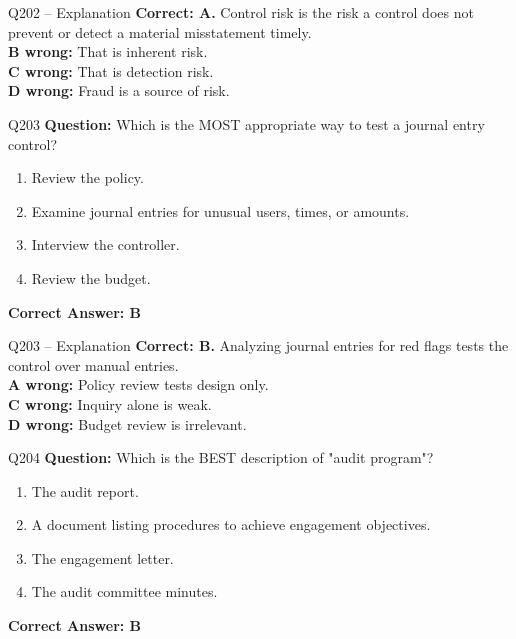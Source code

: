 \documentclass[aspectratio=169,10pt]{beamer}
\begin{document}
	\begin{frame}[t]{Q202 -- Explanation}
		\small
		\textbf{Correct: A.} Control risk is the risk a control does not prevent or detect a material misstatement timely. \\[4pt]
		\textbf{B wrong:} That is inherent risk. \\[2pt]
		\textbf{C wrong:} That is detection risk. \\[2pt]
		\textbf{D wrong:} Fraud is a source of risk.
	\end{frame}
	
	\begin{frame}[t]{Q203}
		\small
		\textbf{Question:} Which is the MOST appropriate way to test a journal entry control?
		\begin{enumerate}[label=\Alph*.,itemsep=1pt,topsep=2pt]
			\item Review the policy.
			\item Examine journal entries for unusual users, times, or amounts.
			\item Interview the controller.
			\item Review the budget.
		\end{enumerate}
		\vspace{4pt}
		\textbf{Correct Answer: B}
	\end{frame}
	
	\begin{frame}[t]{Q203 -- Explanation}
		\small
		\textbf{Correct: B.} Analyzing journal entries for red flags tests the control over manual entries. \\[4pt]
		\textbf{A wrong:} Policy review tests design only. \\[2pt]
		\textbf{C wrong:} Inquiry alone is weak. \\[2pt]
		\textbf{D wrong:} Budget review is irrelevant.
	\end{frame}
	
	\begin{frame}[t]{Q204}
		\small
		\textbf{Question:} Which is the BEST description of "audit program"?
		\begin{enumerate}[label=\Alph*.,itemsep=1pt,topsep=2pt]
			\item The audit report.
			\item A document listing procedures to achieve engagement objectives.
			\item The engagement letter.
			\item The audit committee minutes.
		\end{enumerate}
		\vspace{4pt}
		\textbf{Correct Answer: B}
	\end{frame}
	
\end{document}
